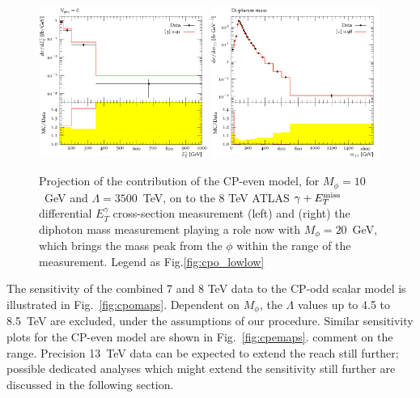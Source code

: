 \documentclass[11pt]{cernrep}
\begin{document}
\begin{figure}
\begin{center}
\includegraphics[width=0.49\textwidth]{ATLAS_2016_I1448301_NU_d08-x01-y01-10-3500e.pdf}
\includegraphics[width=0.49\textwidth]{ATLAS_2017_I1591327_d02-x01-y01-20-3500e.pdf}
    \caption{Projection of the contribution of the CP-even model, for $M_{\phi} = 10$~GeV and $\Lambda = 3500$~TeV, on to the 
8 TeV ATLAS $\gamma+E_T^{\rm miss}$ differential $E_T^\gamma$ cross-section measurement (left) and (right) the 
diphoton mass measurement playing a role now with $M_{\phi} = 20$~GeV, which brings the mass peak from the $\phi$ within
the range of the measurement.
Legend as Fig.\protect\ref{fig:cpo_lowlow}}
\label{fig:cpe_lowlow}
\end{center}
\end{figure}

The sensitivity of the combined 7 and 8 TeV data to the CP-odd scalar model is illustrated in Fig.~\ref{fig:cpomaps}.
Dependent on $M_\phi$, the $\Lambda$ values up to 4.5 to 8.5~TeV are excluded, under the assumptions of our procedure. 
Similar sensitivity plots for the CP-even model are shown in Fig.~\ref{fig:cpemaps}. comment on the range.
Precision 13~TeV data can be expected to extend the reach still further; possible dedicated analyses which might extend the
sensitivity still further are discussed in the following section.
\end{document}
